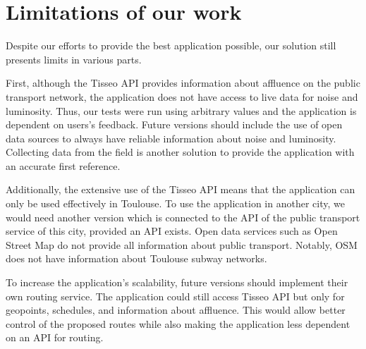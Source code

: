 \section{Limitations of our work}


Despite our efforts to provide the best application possible, our solution still presents limits in various parts.


First, although the Tisseo API provides information about affluence on the public transport network, the application does not have access to live data for noise and luminosity. Thus, our tests were run using arbitrary values and the application is dependent on users’s feedback. Future versions should include the use of open data sources to always have reliable information about noise and luminosity. Collecting data from the field is another solution to provide the application with an accurate first reference.


Additionally, the extensive use of the Tisseo API means that the application can only be used effectively in Toulouse. To use the application in another city, we would need another version which is connected to the API of the public transport service of this city, provided an API exists. Open data services such as Open Street Map do not provide all information about public transport. Notably, OSM does not have information about Toulouse subway networks.


To increase the application's scalability, future versions should implement their own routing service. The application could still access Tisseo API but only for geopoints, schedules, and information about affluence. This would allow better control of the proposed routes while also making the application less dependent on an API for routing.
